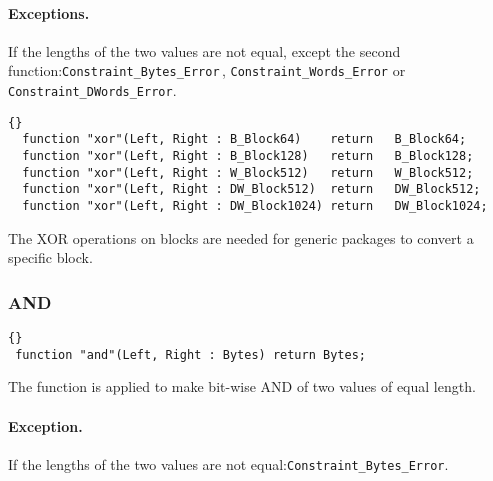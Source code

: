 \paragraph{Exceptions.} If the lengths of the two values are not
equal, except the second function:\quad\texttt{Constraint\_Bytes\_Error}\,,
\texttt{Constraint\_Words\_Error} or \texttt{Constraint\_DWords\_Error}.

\begin{lstlisting}{}
  function "xor"(Left, Right : B_Block64)    return   B_Block64;
  function "xor"(Left, Right : B_Block128)   return   B_Block128;
  function "xor"(Left, Right : W_Block512)   return   W_Block512;
  function "xor"(Left, Right : DW_Block512)  return   DW_Block512;
  function "xor"(Left, Right : DW_Block1024) return   DW_Block1024;
\end{lstlisting}
The XOR operations on blocks are needed for generic packages to
convert a specific block.

\hhline
\subsubsection*{AND}
\begin{lstlisting}{}
 function "and"(Left, Right : Bytes) return Bytes;
\end{lstlisting}
The function is applied to make bit-wise AND of two values of equal
length.\\

\paragraph{Exception.} If the lengths of the two values are not
equal:\quad\texttt{Constraint\_Bytes\_Error}.

\hhline
